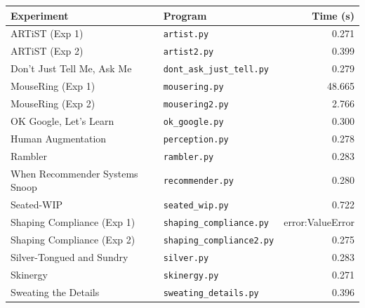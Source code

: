 \begin{tabular}{llr}
\toprule
Experiment & Program & Time (s) \\
\midrule
ARTiST (Exp 1) & \texttt{artist.py} & 0.271 \\
ARTiST (Exp 2) & \texttt{artist2.py} & 0.399 \\
Don't Just Tell Me, Ask Me & \texttt{dont\_ask\_just\_tell.py} & 0.279 \\
MouseRing (Exp 1) & \texttt{mousering.py} & 48.665 \\
MouseRing (Exp 2) & \texttt{mousering2.py} & 2.766 \\
OK Google, Let's Learn & \texttt{ok\_google.py} & 0.300 \\
Human Augmentation & \texttt{perception.py} & 0.278 \\
Rambler & \texttt{rambler.py} & 0.283 \\
When Recommender Systems Snoop & \texttt{recommender.py} & 0.280 \\
Seated-WIP & \texttt{seated\_wip.py} & 0.722 \\
Shaping Compliance (Exp 1) & \texttt{shaping\_compliance.py} & error:ValueError \\
Shaping Compliance (Exp 2) & \texttt{shaping\_compliance2.py} & 0.275 \\
Silver-Tongued and Sundry & \texttt{silver.py} & 0.283 \\
Skinergy & \texttt{skinergy.py} & 0.271 \\
Sweating the Details & \texttt{sweating\_details.py} & 0.396 \\
\bottomrule
\end{tabular}

